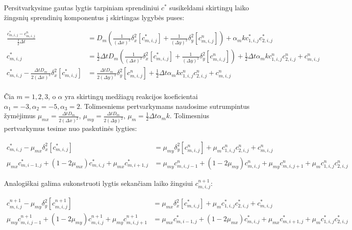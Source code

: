 Persitvarkysime gautas lygtis tarpiniam sprendiniui $c^*$ susikeldami skirtingų laiko žingsnių sprendinių komponentus į skirtingas lygybės puses:

\begin{align*}
  \frac{c^{*}_{m,i,j} - c^n_{m,i,j}}{\frac{1}{2}\Delta t} 
  &= D_m \left( \frac{1}{(\Delta x)^2}\delta_x^2[c^{*}_{m,i,j}] 
  + \frac{1}{(\Delta y)^2}\delta_y^2[c^n_{m,i,j}] \right) 
  + \alpha_mkc^*_{1,i,j}c^*_{2,i,j} \\
  c^*_{m,i,j} 
  &= \frac{1}{2}\Delta t D_m \left( \frac{1}{(\Delta x)^2}\delta_x^2[c^{*}_{m,i,j}] 
  + \frac{1}{(\Delta y)^2}\delta_y^2[c^n_{m,i,j}] \right)
  + \frac{1}{2}\Delta t \alpha_m kc^n_{1,i,j}c^n_{2,i,j} + c^n_{m,i,j}\\
  c^*_{m,i,j} - \frac{\Delta t D_m}{2(\Delta x)^2}\delta_x^2[c^{*}_{m,i,j}] 
  &= \frac{\Delta t D_m}{2(\Delta y)^2}\delta_y^2[c^n_{m,i,j}]
  + \frac{1}{2}\Delta t \alpha_m kc^n_{1,i,j}c^n_{2,i,j} + c^n_{m,i,j}\\
\end{align*}

Čia $m = 1, 2, 3$,  o $\alpha$ yra skirtingų medžiagų reakcijos koeficientai $\alpha_1 = -3, \alpha_2 = -5, \alpha_3 = 2$. Tolimesniems pertvarkymams naudosime sutrumpintus žymėjimus $\mu_{mx} = \frac{\Delta t D_m}{2(\Delta x)^2}$, $\mu_{my} = \frac{\Delta t D_m}{2(\Delta y)^2}$, $\mu_m = \frac{1}{2}\Delta t \alpha_m k$. Tolimesnius pertvarkymus tesime nuo paskutinės lygties:

\begin{align*}
  c^*_{m,i,j} - \mu_{mx}\delta_x^2[c^{*}_{m,i,j}]
  &= \mu_{my}\delta_y^2[c^n_{m,i,j}] + \mu_m c^n_{1,i,j}c^n_{2,i,j} + c^n_{m,i,j}\\
  \mu_{mx}c^{*}_{m,i-1,j}+(1-2\mu_{mx})c^{*}_{m,i,j}+\mu_{mx}c^{*}_{m,i+1,j}
  &= \mu_{my}c^n_{m,i,j-1}+(1-2\mu_{my})c^n_{m,i,j}+\mu_{my}c^n_{m,i,j+1}+\mu_m c^n_{1,i,j}c^n_{2,i,j}
\end{align*}

Analogiškai galima sukonstruoti lygtis sekančiam laiko žingsiui $c^{n+1}_{m,i,j}$:

\begin{align*}
  c^{n+1}_{m,i,j} - \mu_{my}\delta_y^2[c^{n+1}_{m,i,j}]
  &= \mu_{mx}\delta_x^2[c^*_{m,i,j}] + \mu_m c^*_{1,i,j}c^*_{2,i,j} + c^*_{m,i,j}\\
  \mu_{my}c^{n+1}_{m,i,j-1}+(1-2\mu_{my})c^{n+1}_{m,i,j}+\mu_{my}c^{n+1}_{m,i,j+1}
  &= \mu_{mx}c^*_{m,i-1,j}+(1-2\mu_{mx})c^*_{m,i,j}+\mu_{mx}c^*_{m,i+1,j}+\mu_m c^*_{1,i,j}c^*_{2,i,j}
\end{align*}

